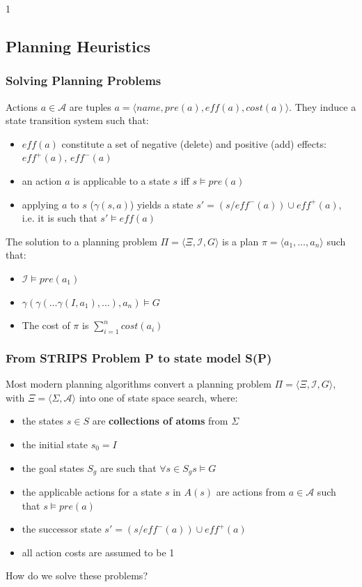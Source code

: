 \documentclass{beamer}
\def\masterclass{1}
\begin{document}
\if\masterclass1
	

\subsection{Planning Heuristics}
	
	\begin{frame}[c]\frametitle{Solving Planning Problems}
		Actions $a \in \mathcal{A}$ are tuples $a = \langle \mathit{name}, \mathit{pre}(a), \mathit{eff}(a), \mathit{cost}(a) \rangle$.
		They induce a state transition system such that:
		\begin{itemize}
			\item $\mathit{eff}(a)$ constitute a set of negative (delete) and positive (add) effects: $\mathit{eff}^{+}(a)$, $\mathit{eff}^{-}(a)$
			\item an action $a$ is applicable to a state $s$ iff $s \models \mathit{pre}(a)$
			\item applying $a$ to $s$ ($\gamma(s,a)$) yields a state $s' = (s / \mathit{eff}^{-}(a)) \cup  \mathit{eff}^{+}(a)$, \\i.e. it is such that $s' \models \mathit{eff}(a)$
		\end{itemize}
		The solution to a planning problem $\Pi = \langle \Xi, \mathcal{I}, G\rangle$ is a plan $\pi = \langle a_1, \dots, a_n\rangle$ such that:
		\begin{itemize}
			\item $\mathcal{I} \models \mathit{pre}(a_1)$
			\item $\gamma(\gamma(\dots \gamma(I, a_1),\dots), a_n) \models G$
			\item The cost of $\pi$ is $\sum_{i=1}^{n}\mathit{cost}(a_i)$
		\end{itemize}
	\end{frame}
	
	\begin{frame}[c]\frametitle{From STRIPS Problem P to state model S(P)}
		Most modern planning algorithms convert a planning problem $\Pi = \langle \Xi, \mathcal{I}, G\rangle$, with $\Xi = \langle \Sigma, \mathcal{A} \rangle$ into one of state space search, where:
		\begin{itemize}
			\item the states $s \in S$ are \textbf{collections of atoms} from $\Sigma$
			\item the initial state $s_0 = I$
			\item the goal states $S_g$ are such that $\forall{s \in S_g} s \models G$
			\item the applicable actions for a state $s$ in $A(s)$ are actions from $a \in  \mathcal{A}$ such that $s \models \mathit{pre}(a)$
			\item the successor state $s' = (s / \mathit{eff}^{-}(a)) \cup  \mathit{eff}^{+}(a)$
			\item all action costs are assumed to be 1
		\end{itemize}
		How do we solve these problems?
	\end{frame}
	
\end{document}
